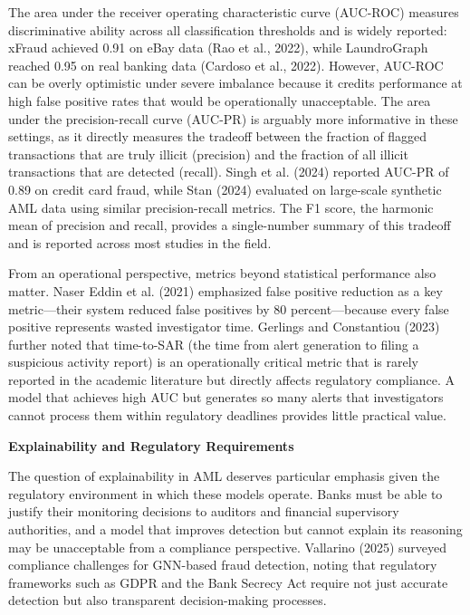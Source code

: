 \documentclass[12pt,a4paper]{article}
\begin{document}
The area under the receiver operating characteristic curve (AUC-ROC) measures discriminative ability across all classification thresholds and is widely reported: xFraud achieved 0.91 on eBay data (Rao et al., 2022), while LaundroGraph reached 0.95 on real banking data (Cardoso et al., 2022). However, AUC-ROC can be overly optimistic under severe imbalance because it credits performance at high false positive rates that would be operationally unacceptable. The area under the precision-recall curve (AUC-PR) is arguably more informative in these settings, as it directly measures the tradeoff between the fraction of flagged transactions that are truly illicit (precision) and the fraction of all illicit transactions that are detected (recall). Singh et al. (2024) reported AUC-PR of 0.89 on credit card fraud, while Stan (2024) evaluated on large-scale synthetic AML data using similar precision-recall metrics. The F1 score, the harmonic mean of precision and recall, provides a single-number summary of this tradeoff and is reported across most studies in the field.

From an operational perspective, metrics beyond statistical performance also matter. Naser Eddin et al. (2021) emphasized false positive reduction as a key metric---their system reduced false positives by 80 percent---because every false positive represents wasted investigator time. Gerlings and Constantiou (2023) further noted that time-to-SAR (the time from alert generation to filing a suspicious activity report) is an operationally critical metric that is rarely reported in the academic literature but directly affects regulatory compliance. A model that achieves high AUC but generates so many alerts that investigators cannot process them within regulatory deadlines provides little practical value.

\bigskip
\noindent\textbf{Explainability and Regulatory Requirements}

\noindent The question of explainability in AML deserves particular emphasis given the regulatory environment in which these models operate. Banks must be able to justify their monitoring decisions to auditors and financial supervisory authorities, and a model that improves detection but cannot explain its reasoning may be unacceptable from a compliance perspective. Vallarino (2025) surveyed compliance challenges for GNN-based fraud detection, noting that regulatory frameworks such as GDPR and the Bank Secrecy Act require not just accurate detection but also transparent decision-making processes.
\end{document}
